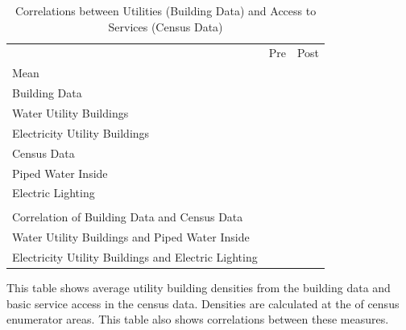 \documentclass[12pt]{article}
\begin{document}
\begin{table}[ht!]
\small
\centering
\caption{Correlations between Utilities (Building Data) and Access to Services (Census Data)   }\label{table:utilcorr}
\vspace{-2mm}
\begin{threeparttable}
\begin{tabular}{lCC}
\toprule
 &Pre & Post \\
Mean &  & \\
\midrule
Building Data  \\
\hspace{1cm} Water Utility Buildings&  &  \\
\hspace{1cm} Electricity Utility Buildings&  &  \\
Census Data  \\
\hspace{1cm} Piped Water Inside &  &  \\
\hspace{1cm} Electric Lighting &  &  \\
\\
Correlation of Building Data and Census Data \\
\midrule
\hspace{1cm} Water Utility Buildings and Piped Water Inside &  &  \\
\hspace{1cm} Electricity Utility Buildings and Electric Lighting &  &  \\
\bottomrule
\end{tabular}
\begin{tablenotes}
\item \footnotesize 
 This table shows average utility building densities from the building data and basic service access in the census data.  Densities are calculated at the of census enumerator areas. This table also shows correlations between these measures.
\end{tablenotes}
\end{threeparttable}
\end{table}
\end{document}
